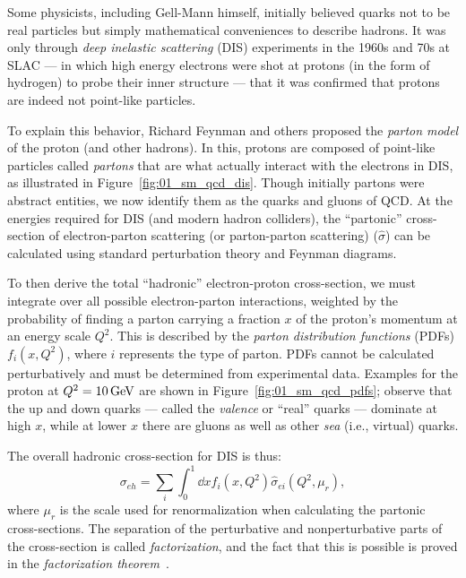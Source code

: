 Some physicists, including Gell-Mann himself, initially believed quarks not to be real particles but simply mathematical conveniences to describe hadrons.
It was only through \textit{deep inelastic scattering} (DIS) experiments in the 1960s and 70s at SLAC --- in which high energy electrons were shot at protons (in the form of hydrogen) to probe their inner structure --- that it was confirmed that protons are indeed not point-like particles.

To explain this behavior, Richard Feynman and others proposed the \textit{parton model} of the proton (and other hadrons).
In this, protons are composed of point-like particles called \textit{partons} that are what actually interact with the electrons in DIS, as illustrated in Figure~\ref{fig:01_sm_qcd_dis}.
Though initially partons were abstract entities, we now identify them as the quarks and gluons of QCD.
At the energies required for DIS (and modern hadron colliders), the ``partonic'' cross-section of electron-parton scattering (or parton-parton scattering) ($\hat\sigma$) can be calculated using standard perturbation theory and Feynman diagrams.

To then derive the total ``hadronic'' electron-proton cross-section, we must integrate over all possible electron-parton interactions, weighted by the probability of finding a parton carrying a fraction $x$ of the proton's momentum at an energy scale $Q^2$.
This is described by the \textit{parton distribution functions} (PDFs) $f_i(x, Q^2)$, where $i$ represents the type of parton.
PDFs cannot be calculated perturbatively and must be determined from experimental data.
Examples for the proton at $Q^2 = 10 \,\text{Ge\hspace{-.08em}V}$ are shown in Figure~\ref{fig:01_sm_qcd_pdfs}; observe that the up and down quarks --- called the \textit{valence} or ``real'' quarks --- dominate at high $x$, while at lower $x$ there are gluons as well as other \textit{sea} (i.e., virtual) quarks.

The overall hadronic cross-section for DIS is thus:
\begin{equation}
	\label{eq:01_sm_qcd_sigma_ep}
	\sigma_{eh} = \sum_{i} \int_0^1 \dd x f_i(x, Q^2) \hat\sigma_{ei}(Q^2, \mu_r),
\end{equation}
where $\mu_r$ is the scale used for renormalization when calculating the partonic cross-sections.
The separation of the perturbative and nonperturbative parts of the cross-section is called \textit{factorization}, and the fact that this is possible is proved in the \textit{factorization theorem}~\cite{Collins:1989gx}.

